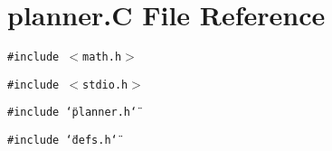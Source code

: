 \section{planner.C File Reference}
\label{planner_8C}
{\tt \#include $<$math.h$>$}\par
{\tt \#include $<$stdio.h$>$}\par
{\tt \#include \char`\"{}planner.h\char`\"{}}\par
{\tt \#include \char`\"{}defs.h\char`\"{}}\par
